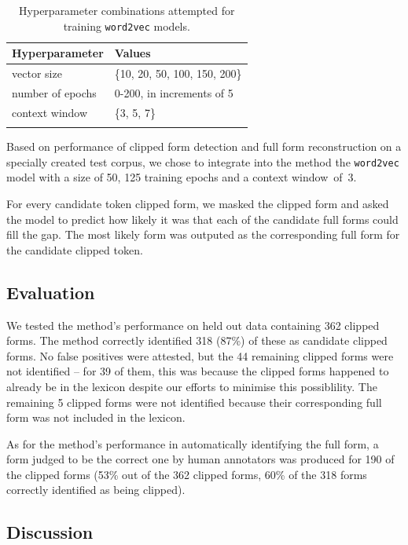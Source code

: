 \documentclass[output=paper,colorlinks,citecolor=brown]{langscibook}
\begin{document}
\begin{table}[H]
	\centering
	\begin{tabular}{l|l}
		\lsptoprule
		Hyperparameter & Values  \\
		\midrule
		vector size  & \{10, 20, 50, 100, 150, 200\} \\
		number of epochs & 0-200, in increments of 5 \\
		context window & \{3, 5, 7\} \\
		\lspbottomrule
	\end{tabular}
	\caption{Hyperparameter combinations attempted for training \texttt{word2vec} models.}
	\label{tab:hyperparameters}
\end{table}

Based on performance of clipped form detection and full form reconstruction on a specially created test corpus, we chose to integrate into the method the \texttt{word2vec} model with a size of 50, 125 training epochs and a context window~of~3.

For every candidate token clipped form, we masked the clipped form and asked  the model to predict how likely it was that each of the candidate full forms could fill the gap. The most likely form was outputed as the corresponding full form for the candidate clipped token.


\subsection{Evaluation}\label{sec:corpus:eval}
We tested the method's performance on held out data containing 362 clipped forms. The method correctly identified 318 (87\%) of these as candidate clipped forms. No false positives were attested, but the 44 remaining clipped forms were not identified -- for 39 of them, this was because the clipped forms happened to already be in the lexicon despite our efforts to minimise this possiblility. The remaining 5 clipped forms were not identified because their corresponding full form was not included in the lexicon.

As for the method's performance in automatically identifying the full form, a form judged to be the correct one by human annotators was produced for 190 of the clipped forms (53\% out of the 362 clipped forms, 60\% of the 318 forms correctly identified as being clipped). 

\subsection{Discussion}\label{sec:corpus:discussion}
\end{document}
